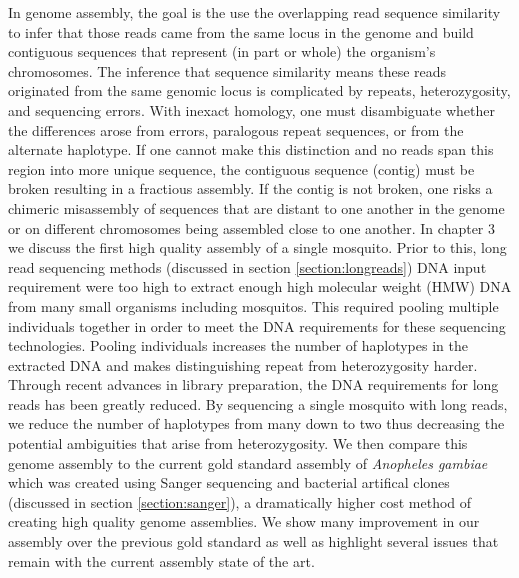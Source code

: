 \par{
In genome assembly, the goal is the use the overlapping read sequence similarity to infer that those reads came from the same locus in the genome and build contiguous sequences that represent (in part or whole) the organism's chromosomes. The inference that sequence similarity means these reads originated from the same genomic locus is complicated by repeats, heterozygosity, and sequencing errors. With inexact homology, one must disambiguate whether the differences arose from errors, paralogous repeat sequences, or from the alternate haplotype. If one cannot make this distinction and no reads span this region into more unique sequence, the contiguous sequence (contig) must be broken resulting in a fractious assembly. If the contig is not broken, one risks a chimeric misassembly of sequences that are distant to one another in the genome or on different chromosomes being assembled close to one another. In chapter 3 we discuss the first high quality assembly of a single mosquito. Prior to this, long read sequencing methods (discussed in section \ref{section:longreads}) DNA input requirement were too high to extract enough high molecular weight (HMW) DNA from many small organisms including mosquitos. This required pooling multiple individuals together in order to meet the DNA requirements for these sequencing technologies. Pooling individuals increases the number of haplotypes in the extracted DNA and makes distinguishing repeat from heterozygosity harder. Through recent advances in library preparation, the DNA requirements for long reads has been greatly reduced. By sequencing a single mosquito with long reads, we reduce the number of haplotypes from many down to two thus decreasing the potential ambiguities that arise from heterozygosity. We then compare this genome assembly to the current gold standard assembly of \textit{Anopheles gambiae} which was created using Sanger sequencing and bacterial artifical clones (discussed in section \ref{section:sanger}), a dramatically higher cost method of creating high quality genome assemblies. We show many improvement in our assembly over the previous gold standard as well as highlight several issues that remain with the current assembly state of the art.
} 



